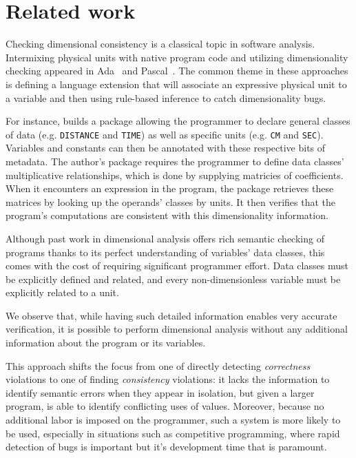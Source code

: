 \documentclass[12pt]{article}
\begin{document}
\section{Related work}

Checking dimensional consistency is a classical topic in software analysis. Intermixing physical units with native program code and utilizing dimensionality checking appeared in Ada~\cite{hilfinger1988ada} and Pascal~\cite{dreiheller1986programming, gehani1977units}. The common theme in these approaches is defining a language extension that will associate an expressive physical unit to a variable and then using rule-based inference to catch dimensionality bugs. 

For instance, \cite{hilfinger1988ada} builds a package allowing the programmer to declare general classes of data (e.g. \texttt{DISTANCE} and \texttt{TIME}) as well as specific units (e.g. \texttt{CM} and \texttt{SEC}). Variables and constants can then be annotated with these respective bits of metadata. The author's package requires the programmer to define data classes' multiplicative relationships, which is done by supplying matricies of coefficients.
When it encounters an expression in the program, the package retrieves these matrices by looking up the operands' classes by units. It then verifies that the program's computations are consistent with this dimensionality information.

Although past work in dimensional analysis offers rich semantic checking of programs thanks to its perfect understanding of variables' data classes, this comes with the cost of requiring significant programmer effort. Data classes must be explicitly defined and related, and every non-dimensionless variable must be explicitly related to a unit.

We observe that, while having such detailed information enables very accurate verification, it is possible to perform dimensional analysis without any additional information about the program or its variables.

This approach shifts the focus from one of directly detecting \textit{correctness} violations to one of finding \textit{consistency} violations: it lacks the information to identify semantic errors when they appear in isolation, but given a larger program, is able to identify conflicting uses of values. Moreover, because no additional labor is imposed on the programmer, such a system is more likely to be used, especially in situations such as competitive programming, where rapid detection of bugs is important but it's development time that is paramount.
\end{document}
